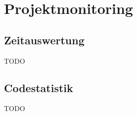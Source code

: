 
\section{Projektmonitoring}
\label{sec:Projektmonitoring}

\subsection{Zeitauswertung}
\label{sub:Zeitauswertung}

TODO

\subsection{Codestatistik}
\label{sub:Codestatistik}

TODO